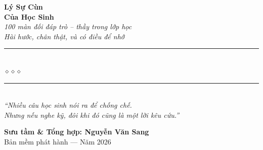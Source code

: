 \begin{titlepage}
\begin{center}
  {\fontsize{34}{40}\selectfont\bfseries\color{inkdark!80!black}
    Lý Sự Cùn}\\[0.35cm]
  {\fontsize{34}{40}\selectfont\bfseries\color{sunclay!85!black}
    Của Học Sinh}\\[0.4cm]

  {\fontsize{16}{20}\selectfont\color{sunclay!90!black}\itshape
    100 màn đối đáp trò -- thầy trong lớp học\\
    Hài hước, chân thật, và có điều để nhớ}\\[1cm]

  {\color{chalkgreen!60}\rule{6cm}{1pt}}\\[5pt]
  {\color{sunclay!80!black}\large$\diamond$\hspace{1cm}$\diamond$\hspace{1cm}$\diamond$}\\[5pt]
  {\color{chalkgreen!60}\rule{6cm}{1pt}}\\[1.5cm]

  {\normalsize\itshape\color{chalkgreen!90!black}
   ``Nhiều câu học sinh nói ra để chống chế.\\
   Nhưng nếu nghe kỹ, đôi khi đó cũng là một lời kêu cứu.''}

  \vfill

  {\fontsize{16}{20}\selectfont\bfseries\color{chalkgreen!90!black}
    Sưu tầm \& Tổng hợp: \textbf{Nguyễn Văn Sang}}\\[0.4cm]

  {\small\color{gray} Bản mềm phát hành --- Năm 2026}\\[0.5cm]
\end{center}

\afterpage{\nopagecolor}
\end{titlepage}